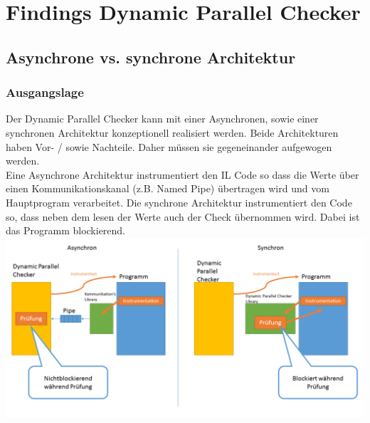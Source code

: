 \documentclass[10pt,a4paper]{article}
\begin{document}
\section{Findings Dynamic Parallel Checker}
\subsection{Asynchrone vs. synchrone Architektur}
\subsubsection{Ausgangslage}
\begin{flushleft}
Der Dynamic Parallel Checker kann mit einer Asynchronen, sowie einer synchronen Architektur konzeptionell realisiert werden. Beide Architekturen haben Vor- / sowie Nachteile. Daher müssen sie gegeneinander aufgewogen werden.\\
Eine Asynchrone Architektur instrumentiert den IL Code so dass die Werte über einen Kommunikationskanal (z.B. Named Pipe) übertragen wird und vom Hauptprogram verarbeitet.
Die synchrone Architektur instrumentiert den Code so, dass neben dem lesen der Werte auch der Check übernommen wird. Dabei ist das Programm blockierend.
\includegraphics[width=16cm, clip]{pictures/AsnycSyncArchitecture.png}
\end{flushleft}
\end{document}
